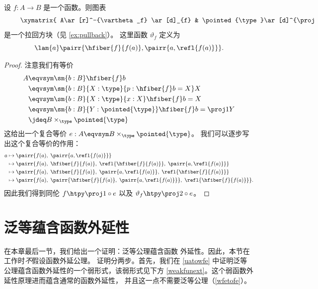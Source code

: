 \begin{thm}\label{thm:object-classifier}
设 $f:A\to B$ 是一个函数。则图表
\begin{equation*}
  \vcenter{\xymatrix{
      A\ar[r]^-{\vartheta_f} \ar[d]_{f} &
      \pointed{\type}\ar[d]^{\proj1}\\
      B\ar[r]_{\chi_f} &
      \type
      }}
\end{equation*}
是一个拉回方块（见 \cref{ex:pullback}）。
这里函数 $\vartheta_f$ 定义为
\begin{equation*}
 \lam{a} \pairr{\hfiber{f}{f(a)},\pairr{a,\refl{f(a)}}}.
\end{equation*}
\end{thm}
\begin{proof}
注意我们有等价
\begin{align*}
A & \eqvsym \sm{b:B} \hfiber{f}b\\
& \eqvsym \sm{b:B}{X:\type}{p:\hfiber{f}b= X} X\\
& \eqvsym \sm{b:B}{X:\type}{x:X} \hfiber{f}b= X\\
& \eqvsym \sm{b:B}{Y:\pointed{\type}} \hfiber{f}b = \proj1 Y\\
& \jdeq B\times_{\type}\pointed{\type}
\end{align*}
这给出一个复合等价 $e:A\eqvsym B\times_\type\pointed{\type}$。
我们可以逐步写出这个复合等价的作用：
\begin{align*}
a & \mapsto \pairr{f(a),\; \pairr{a,\refl{f(a)}}}\\
& \mapsto \pairr{f(a), \; \hfiber{f}{f(a)}, \; \refl{\hfiber{f}{f(a)}}, \; \pairr{a,\refl{f(a)}}}\\
& \mapsto \pairr{f(a), \; \hfiber{f}{f(a)}, \; \pairr{a,\refl{f(a)}}, \; \refl{\hfiber{f}{f(a)}}}\\
& \mapsto \pairr{f(a), \; \pairr{\hfiber{f}{f(a)}, \; \pairr{a,\refl{f(a)}}}, \; \refl{\hfiber{f}{f(a)}}}.
\end{align*}
因此我们得到同伦 $f\htpy\proj1\circ e$ 以及 $\vartheta_f\htpy \proj2\circ e$。
\end{proof}


\section{泛等蕴含函数外延性}
\label{sec:univalence-implies-funext}

%
在本章最后一节，我们给出一个证明：泛等公理蕴含函数
外延性。因此，本节在工作时\emph{不}假设函数外延公理。
证明分两步。首先，我们在 \cref{uatowfe} 中证明泛等
公理蕴含函数外延性的一个弱形式，该弱形式见下方 \cref{weakfunext}。这个弱函数外延性原理进而蕴含通常的函数外延性，
并且这一点不需要泛等公理（\cref{wfetofe}）。

